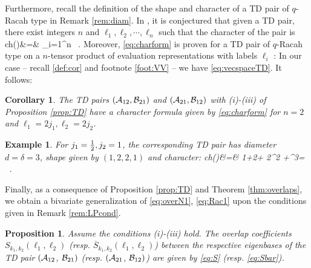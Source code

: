 \documentclass[11pt]{amsart}
\numberwithin{equation}{section}
\newtheorem{cor}[thm]{Corollary}
\newtheorem{prop}[thm]{Proposition}
\newtheorem{example}[thm]{Example}
\numberwithin{equation}{section}
\begin{document}
Furthermore, recall the definition of the shape and character of a TD pair of $q$-Racah type in Remark \ref{rem:diam}. 
In \cite[Conj.\,13.5]{ITT99}, it is conjectured that given a TD pair, there exist integers $n$ and $\ell_1,\ell_2,\cdots,\ell_n$ such that the character of the pair is 
\beqa
ch(\lambda)&=& \prod_{i=1}^n \ .\label{eq:charform} 
\eeqa
Moreover, \eqref{eq:charform} is proven for a TD pair of $q$-Racah type on a $n$-tensor product of evaluation representations with labels $\ell_i$ 
\cite{IT10}:
In our case -- recall \eqref{def:cor} and footnote \ref{foot:VV}  -- we have \eqref{eq:vecspaceTD}. It follows:
\begin{cor} \label{cor:charTD}
The TD pairs $({\cal A}_{12},{\cal B}_{21})$ and $({\cal A}_{21},{\cal B}_{12})$ with (i)-(iii) of Proposition \ref{prop:TD} have a character formula given by \eqref{eq:charform} for $n=2$ and $\ell_1=2j_1,\ell_2=2j_2$.
\end{cor}
\begin{example} For $j_1=\frac{1}{2},j_2=1$, the corresponding TD pair has diameter $d=\delta=3$, shape given by $(1,2,2,1)$ and character:
\beqa
ch(\lambda)&=& 1+2\lambda + 2\lambda^2 +\lambda^3=  \nonumber \ .
\eeqa
\end{example}


Finally, as a consequence of Proposition \ref{prop:TD} and Theorem \ref{thm:overlaps}, we obtain a bivariate generalization of \eqref{eq:overN1}, \eqref{eq:Rac1} upon the conditions given in Remark \ref{rem:LPcond}. 
\begin{prop}\label{prop:overTD} Assume the conditions (i)-(iii) hold. The overlap coefficients ${S}_{k_1,k_2}(\ell_1,\ell_2)$ (resp. $\overline{S}_{k_1,k_2}(\ell_1,\ell_2)$) between the respective eigenbases of the TD pair $({\cal A}_{12}$, ${\cal B}_{21})$ (resp. $({\cal A}_{21}$, ${\cal B}_{12})$) are given by \eqref{eq:S} (resp. \eqref{eq:Sbar}). 
\end{prop}
\end{document}
